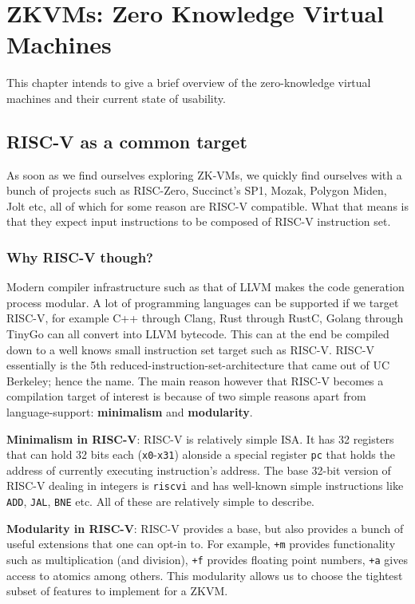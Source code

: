 
\chapter{ZKVMs: Zero Knowledge Virtual Machines}

This chapter intends to give a brief overview of the zero-knowledge virtual machines and their current state of usability.

\section{RISC-V as a common target}
As soon as we find ourselves exploring ZK-VMs, we quickly find ourselves with a bunch of projects such as RISC-Zero, Succinct's SP1, Mozak, Polygon Miden, Jolt etc, all of which for some reason are RISC-V compatible. What that means is that they expect input instructions to be composed of RISC-V instruction set.

\subsection{Why RISC-V though?}
Modern compiler infrastructure such as that of LLVM makes the code generation process modular. A lot of programming languages can be supported if we target RISC-V, for example C++ through Clang, Rust through RustC, Golang through TinyGo can all convert into LLVM bytecode. This can at the end be compiled down to a well knows small instruction set target such as RISC-V. RISC-V essentially is the 5th reduced-instruction-set-architecture that came out of UC Berkeley; hence the name. The main reason however that RISC-V becomes a compilation target of interest is because of two simple reasons apart from language-support: \textbf{minimalism} and \textbf{modularity}.


\textbf{Minimalism in RISC-V}: RISC-V is relatively simple ISA. It has 32 registers that can hold 32 bits each (\texttt{x0}-\texttt{x31}) alonside a special register \texttt{pc} that holds the address of currently executing instruction's address. The base 32-bit version of RISC-V dealing in integers is \texttt{riscvi} and has well-known simple instructions like \texttt{ADD}, \texttt{JAL}, \texttt{BNE} etc. All of these are relatively simple to describe.


\textbf{Modularity in RISC-V}: RISC-V provides a base, but also provides a bunch of useful extensions that one can opt-in to. For example, \texttt{+m} provides functionality such as multiplication (and division), \texttt{+f} provides floating point numbers, \texttt{+a} gives access to atomics among others. This modularity allows us to choose the tightest subset of features to implement for a ZKVM.

